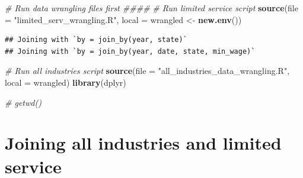 \documentclass[
]{article}
\author{}
\date{\vspace{-2.5em}}
\newenvironment{Shaded}{\begin{snugshade}}{\end{snugshade}}
\newcommand{\AttributeTok}[1]{\textcolor[rgb]{0.13,0.29,0.53}{#1}}
\newcommand{\CommentTok}[1]{\textcolor[rgb]{0.56,0.35,0.01}{\textit{#1}}}
\newcommand{\FunctionTok}[1]{\textcolor[rgb]{0.13,0.29,0.53}{\textbf{#1}}}
\newcommand{\NormalTok}[1]{#1}
\newcommand{\OtherTok}[1]{\textcolor[rgb]{0.56,0.35,0.01}{#1}}
\newcommand{\StringTok}[1]{\textcolor[rgb]{0.31,0.60,0.02}{#1}}
\begin{document}
\begin{Shaded}
\begin{Highlighting}[]
\CommentTok{\# Run data wrangling files first \#\#\#\#}
\CommentTok{\# Run limited service script}
\FunctionTok{source}\NormalTok{(}\AttributeTok{file =} \StringTok{"limited\_serv\_wrangling.R"}\NormalTok{, }\AttributeTok{local =}\NormalTok{ wrangled }\OtherTok{\textless{}{-}} \FunctionTok{new.env}\NormalTok{())}
\end{Highlighting}
\end{Shaded}

\begin{verbatim}
## Joining with `by = join_by(year, state)`
## Joining with `by = join_by(year, date, state, min_wage)`
\end{verbatim}

\begin{Shaded}
\begin{Highlighting}[]
\CommentTok{\# Run all industries script}
\FunctionTok{source}\NormalTok{(}\AttributeTok{file =} \StringTok{"all\_industries\_data\_wrangling.R"}\NormalTok{, }\AttributeTok{local =}\NormalTok{ wrangled)}
\FunctionTok{library}\NormalTok{(dplyr)}
\end{Highlighting}
\end{Shaded}

\begin{Shaded}
\begin{Highlighting}[]
\CommentTok{\# getwd()}
\end{Highlighting}
\end{Shaded}

\hypertarget{joining-all-industries-and-limited-service}{%
\section{Joining all industries and limited
service}\label{joining-all-industries-and-limited-service}}
\end{document}
